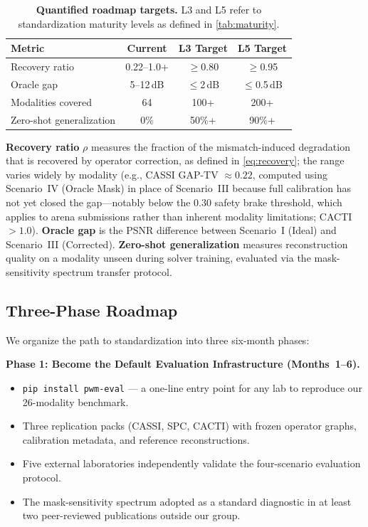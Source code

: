 \begin{table}[t]
\centering
\caption{%
  \textbf{Quantified roadmap targets.}
  L3 and L5 refer to standardization maturity levels as defined in \cref{tab:maturity}.
}
\label{tab:targets}
\small
\begin{tabular}{@{}lccc@{}}
\toprule
\textbf{Metric} & \textbf{Current} & \textbf{L3 Target} & \textbf{L5 Target} \\
\midrule
Recovery ratio        & 0.22--1.0+ & $\geq$0.80    & $\geq$0.95    \\
Oracle gap            & 5--12\,dB  & $\leq$2\,dB   & $\leq$0.5\,dB  \\
Modalities covered    & 64         & 100+     & 200+     \\
Zero-shot generalization & 0\%     & 50\%+    & 90\%+    \\
\bottomrule
\end{tabular}
\end{table}

\noindent
\textbf{Recovery ratio} $\rho$ measures the fraction of the mismatch-induced
degradation that is recovered by operator correction, as defined in
\cref{eq:recovery}; the range varies widely by modality (e.g., CASSI GAP-TV $\approx 0.22$, computed using Scenario~IV (Oracle Mask) in place of Scenario~III because full calibration has not yet closed the gap---notably below the 0.30 safety brake threshold, which applies to arena submissions rather than inherent modality limitations; CACTI $> 1.0$).  \textbf{Oracle gap} is the PSNR difference between Scenario~I
(Ideal) and Scenario~III (Corrected).  \textbf{Zero-shot generalization} measures reconstruction
quality on a modality unseen during solver training, evaluated via the
mask-sensitivity spectrum transfer protocol.

\subsection{Three-Phase Roadmap}

We organize the path to standardization into three six-month phases:

\medskip
\noindent
\textbf{Phase 1: Become the Default Evaluation Infrastructure
(Months~1--6).}

\begin{itemize}
  \item \texttt{pip install pwm-eval} --- a one-line entry point for any
        lab to reproduce our 26-modality benchmark.
  \item Three replication packs (CASSI, SPC, CACTI) with frozen operator
        graphs, calibration metadata, and reference reconstructions.
  \item Five external laboratories independently validate the
        four-scenario evaluation protocol.
  \item The mask-sensitivity spectrum adopted as a standard diagnostic
        in at least two peer-reviewed publications outside our group.
\end{itemize}

